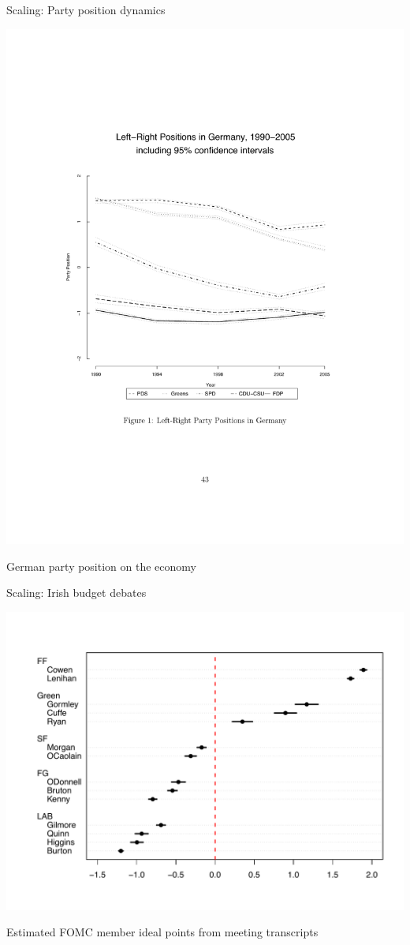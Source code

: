\documentclass{hertieteaching}
\begin{document}
\begin{frame}{Scaling: Party position dynamics}

\centerline{\includegraphics[scale=0.4]{pictures/poissonscaling}}
German party position on the economy \parencite{Slapin.Proksch2008}

\end{frame}


\begin{frame}{Scaling: Irish budget debates}

\centerline{\includegraphics[scale=0.45]{pictures/dotplot_hscaled}}
Estimated FOMC member ideal points from meeting transcripts  \parencite{Lowe.Benoit2013}

\end{frame}
\end{document}
